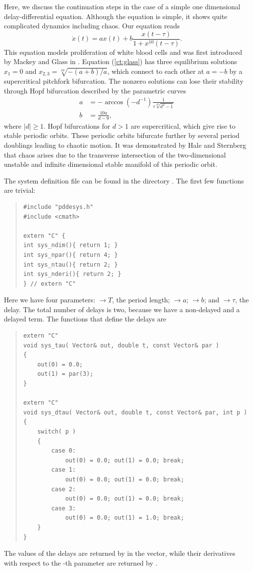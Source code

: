 \documentclass[10pt,a4paper]{ddedoc}
\begin{document}
Here, we discuss the continuation steps in the case of a simple one dimensional
delay-differential equation. Although the equation is simple, it shows quite
complicated dynamics including chaos. Our equation reads
\begin{equation}
  \dot{x} ( t ) = ax ( t ) + b \frac{x ( t - \tau )}{1 + x^{10} ( t - \tau )}.
\label{ct:glass}
\end{equation}
This equation models proliferation of white blood cells and was first
introduced by Mackey and Glass in {\cite{mackey}}. Equation (\ref{ct:glass})
has three equilibrium solutions $x_1 = 0$ and $x_{2, 3} = \sqrt[10]{- ( a + b
) / a}$, which connect to each other at $a = - b$ by a supercritical pitchfork
bifurcation. The nonzero solutions can lose their stability through Hopf
bifurcation described by the parametric curves
\begin{align*}
  a & =-\arccos(-d^{-1}){\frac{1}{{\tau} {\sqrt[10]{d^2-1}}}}\\
  b & ={\frac{10a}{d-9}},
\end{align*}
where $|d| \ge 1$. Hopf bifurcations for $d > 1$ are supercritical, which give
rise to stable periodic orbits. These periodic orbits bifurcate further by
several period doublings leading to chaotic motion. It was demonstrated by
Hale and Sternberg {\cite{sternberg}} that chaos arises due to the transverse
intersection of the two-dimensional unstable and infinite dimensional stable
manifold of this periodic orbit.

The system definition file can be found in the directory
. The first few functions are trivial:
{ \small \begin{quote} \begin{lstlisting}[frame=single]
#include "pddesys.h"
#include <cmath>

extern "C" {
int sys_ndim(){ return 1; }
int sys_npar(){ return 4; }
int sys_ntau(){ return 2; }
int sys_nderi(){ return 2; }
} // extern "C"
\end{lstlisting} \end{quote} } \noindent
Here we have four parameters:
$\to T$, the period length;
$\to a$;
$\to b$; and
$\to \tau$, the delay.
The total number of delays is two, because we have a non-delayed and a delayed
term.
The functions that define the delays are
{ \small \begin{quote} \begin{lstlisting}[frame=single]
extern "C"
void sys_tau( Vector& out, double t, const Vector& par ) 
{
	out(0) = 0.0;
	out(1) = par(3);
}

extern "C"
void sys_dtau( Vector& out, double t, const Vector& par, int p ) 
{
	switch( p )
	{
		case 0:
			out(0) = 0.0; out(1) = 0.0; break;
		case 1:
			out(0) = 0.0; out(1) = 0.0; break;
		case 2:
			out(0) = 0.0; out(1) = 0.0; break;
		case 3:
			out(0) = 0.0; out(1) = 1.0; break;
	}
}
\end{lstlisting} \end{quote} } \noindent
The values of the delays are returned by  in the 
vector, while their derivatives with respect to the -th parameter are
returned by .
\end{document}
